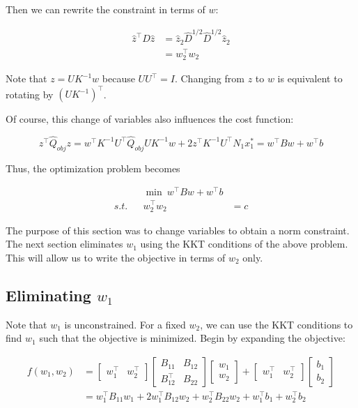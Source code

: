 \documentclass{article}
\begin{document}
    Then we can rewrite the constraint in terms of $w$:

\begin{align}
\hat{z}^\top D\hat{z} &= \hat{z}_2\hat{D}^{1/2}\hat{D}^{1/2}\hat{z}_2 \\
&= w_2^\top w_2
\end{align}

Note that $z = UK^{-1}w$ because $UU^\top = I$. Changing from $z$ to $w$
is equivalent to rotating by $(UK^{-1})^\top$.

Of course, this change of variables also influences the cost function:

\[ z^\top \hat{Q}_{obj}z = w^\top K^{-1}U^\top \hat{Q}_{obj}UK^{-1}w + 2z^\top K^{-1}U^\top N_1x_1^* = w^\top Bw + w^\top b\]

Thus, the optimization problem becomes

\begin{align}
&& \min~ w^\top Bw + w^\top b \\
s.t. && w_2^\top w_2 &= c
\end{align}

The purpose of this section was to change variables to obtain a norm
constraint. The next section eliminates $w_1$ using the KKT conditions
of the above problem. This will allow us to write the objective in terms
of $w_2$ only.

    \subsection{Eliminating $w_1$}\label{eliminating-wux5f1}

Note that $w_1$ is unconstrained. For a fixed $w_2$, we can use the KKT
conditions to find $w_1$ such that the objective is minimized. Begin by
expanding the objective:

\begin{align*} f(w_1,w_2) &=
\begin{bmatrix} w_1^\top & w_2^\top \end{bmatrix}
\begin{bmatrix} B_{11} & B_{12} \\ B_{12}^\top & B_{22}\end{bmatrix}
\begin{bmatrix} w_1 \\ w_2 \end{bmatrix} + 
\begin{bmatrix} w_1^\top & w_2^\top \end{bmatrix}
\begin{bmatrix} b_1 \\ b_2\end{bmatrix} \\
&=
w_1^\top B_{11}w_1 + 2w_1^\top B_{12}w_2 + w_2^\top B_{22}w_2 + w_1^\top b_1 + w_2^\top b_2
\end{align*}
\end{document}
